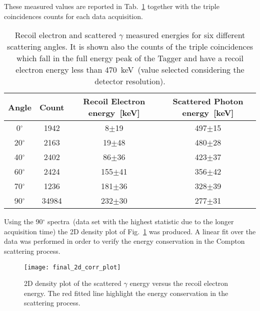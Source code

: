 These measured values are reported in Tab.~\ref{Tab:Scattering_energy} together with the triple coincidences counts for each data acquisition.

\begin{table}[H]
	\centering
	\begin{tabular}{cccc}
		\toprule
		\toprule
		Angle & Count & Recoil Electron energy~[keV] & Scattered Photon energy~[keV] \\
		\midrule
		  0$^\circ$ & 1942 &   8$\pm$19 &  497$\pm$15\\
		20$^\circ$ & 2163 &   19$\pm$48 &  480$\pm$28\\
		40$^\circ$ & 2402 &   86$\pm$36 &  423$\pm$37\\
		60$^\circ$ & 2424 & 155$\pm$41 &  356$\pm$42\\
		70$^\circ$ & 1236 & 181$\pm$36 &  328$\pm$39\\
		90$^\circ$ & 34984 & 232$\pm$30 &  277$\pm$31\\
		\bottomrule
		\bottomrule
	\end{tabular}
	\caption{Recoil electron and scattered $\gamma$ measured energies for six different scattering angles. It is shown also the counts of the triple coincidences which fall in the full energy peak of the Tagger and have a recoil electron energy less than 470~keV~(value selected considering the detector resolution).}
	\label{Tab:Scattering_energy}
\end{table}

Using the 90$^\circ$ spectra~(data set with the highest statistic due to the longer acquisition time) the 2D density plot of Fig.~\ref{Fig:Correlation_Plot} was produced.  A linear fit over the data was performed in order to verify the energy conservation in the Compton scattering process. 
\begin{figure}[h!]
	\centering
	\texttt{[image: final\_2d\_corr\_plot]}
	\caption{2D density plot of the scattered $\gamma$ energy versus the recoil electron energy. The red fitted line highlight the energy conservation in the scattering process.}
	\label{Fig:Correlation_Plot}
\end{figure}

